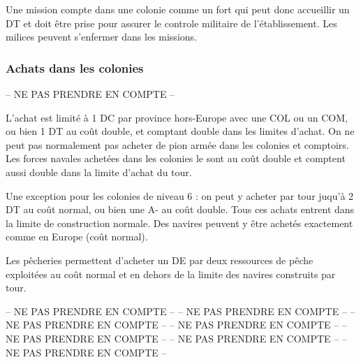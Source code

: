 Une mission compte dans une colonie comme un fort qui peut donc accueillir un DT
et doit être prise pour assurer le controle militaire de l'établissement. 
Les milices peuvent s'enfermer dans les missions.

\subsubsection{Achats dans les colonies}
-- NE PAS PRENDRE EN COMPTE --

L'achat est limité à 1 DC par province hors-Europe avec une COL ou un COM, ou bien
1 DT au coût double, et comptant double dans les limites d'achat.
On ne peut pas normalement pas acheter de pion armée dans les colonies et comptoirs.
Les forces navales achetées dans les colonies le sont au coût double et
comptent aussi double dans la limite d'achat du tour.

Une exception pour les colonies de niveau 6 : 
on peut y acheter par tour juqu'à 2 DT au coût normal, ou bien une
A- au coût double. Tous ces achats entrent dans la limite de construction normale.
Des navires peuvent y être achetés exactement comme en Europe (coût normal).

Les pêcheries permettent d'acheter un DE par deux ressources de pêche exploitées
au coût normal et en dehors de la limite des navires construits par tour.

-- NE PAS PRENDRE EN COMPTE --
-- NE PAS PRENDRE EN COMPTE --
-- NE PAS PRENDRE EN COMPTE --
-- NE PAS PRENDRE EN COMPTE --
-- NE PAS PRENDRE EN COMPTE --
-- NE PAS PRENDRE EN COMPTE --
-- NE PAS PRENDRE EN COMPTE --



